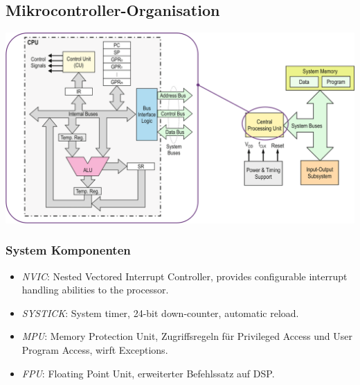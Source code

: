 \subsection{Mikrocontroller-Organisation}

\includegraphics[width=\linewidth]{"Images/MikrocontrollerOrganisation.png"}

\subsubsection{System Komponenten}

\begin{itemize}
	\itemsep-.5em 
	\item \textit{NVIC}: Nested Vectored Interrupt Controller, provides configurable interrupt handling abilities to the processor.
	\item \textit{SYSTICK}: System timer, 24-bit down-counter, automatic reload.
	\item \textit{MPU}: Memory Protection Unit, Zugriffsregeln für Privileged Access und User Program Access, wirft Exceptions.
	\item \textit{FPU}: Floating Point Unit, erweiterter Befehlssatz auf DSP.
\end{itemize}
